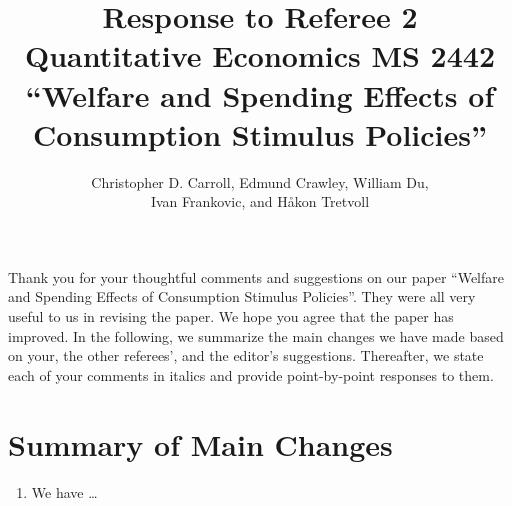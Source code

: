 \documentclass[12pt,letterpaper,english]{article}
\title{\textbf{Response to Referee 2\\ Quantitative Economics MS 2442 \\``Welfare and Spending Effects of \\ Consumption Stimulus Policies''}}
\author{Christopher D. Carroll, Edmund Crawley, William Du, \\ Ivan Frankovic, and H\aa kon Tretvoll}
\date{}
\begin{document}
\onehalfspacing
\maketitle
	
\noindent Thank you for your thoughtful comments and suggestions on our paper ``Welfare and Spending Effects of Consumption Stimulus Policies''. They were all very useful to us in revising the paper. We hope you agree that the paper has improved. In the following, we summarize the main changes we have made based on your, the other referees', and the editor's suggestions. Thereafter, we state each of your comments in italics and provide point-by-point responses to them.
	
\section{Summary of Main Changes}

\begin{enumerate}
	\item We have \ldots 
\end{enumerate}

\newpage 
	
\end{document}

